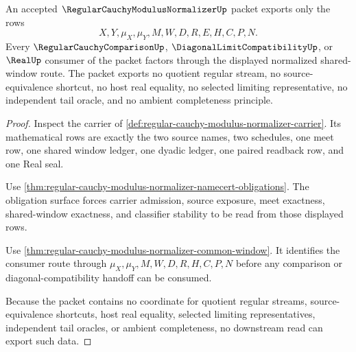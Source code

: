 \begin{theorem}
\label{thm:regular-cauchy-modulus-normalizer-nonescape}
An accepted $\RegularCauchyModulusNormalizerUp$ packet exports only the rows
$$
X,Y,\mu_X,\mu_Y,M,W,D,R,E,H,C,P,N.
$$
Every $\RegularCauchyComparisonUp$, $\DiagonalLimitCompatibilityUp$, or $\RealUp$ consumer of the packet factors through the displayed normalized shared-window route. The packet exports no quotient regular stream, no source-equivalence shortcut, no host real equality, no selected limiting representative, no independent tail oracle, and no ambient completeness principle.
\end{theorem}
\begin{proof}
Inspect the carrier of \autoref{def:regular-cauchy-modulus-normalizer-carrier}. Its mathematical rows are exactly the two source names, two schedules, one meet row, one shared window ledger, one dyadic ledger, one paired readback row, and one Real seal.

Use \autoref{thm:regular-cauchy-modulus-normalizer-namecert-obligations}. The obligation surface forces carrier admission, source exposure, meet exactness, shared-window exactness, and classifier stability to be read from those displayed rows.

Use \autoref{thm:regular-cauchy-modulus-normalizer-common-window}. It identifies the consumer route through $\mu_X,\mu_Y,M,W,D,R,H,C,P,N$ before any comparison or diagonal-compatibility handoff can be consumed.

Because the packet contains no coordinate for quotient regular streams, source-equivalence shortcuts, host real equality, selected limiting representatives, independent tail oracles, or ambient completeness, no downstream read can export such data.
\end{proof}

